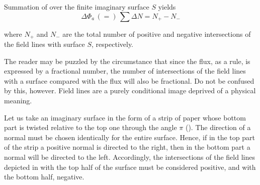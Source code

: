 Summation of  over the finite imaginary surface $S$ yields
\begin{equation}\label{eq:1_76}
	\Delta{\Phi}_a\, (=)\, \sum\Delta{N} = N_+ - N_-
\end{equation}

\noindent
where $N_+$ and $N_-$ are the total number of positive and negative intersections of the field lines with surface $S$, respectively.

The reader may be puzzled by the circumstance that since the flux, as a rule, is expressed by a fractional number, the number of intersections of the field lines with a surface compared with the flux will also be fractional. Do not be confused by this, however. Field lines are a purely conditional image deprived of a physical meaning.

Let us take an imaginary surface in the form of a strip of paper whose bottom part is twisted relative to the top one through the angle $\pi$ (). The direction of a normal must be chosen identically for the entire surface. Hence, if in the top part of the strip a positive normal is directed to the right, then in the bottom part a normal will be directed to the left. Accordingly, the intersections of the field lines depicted in  with the top half of the surface must be considered positive, and with the bottom half, negative.

